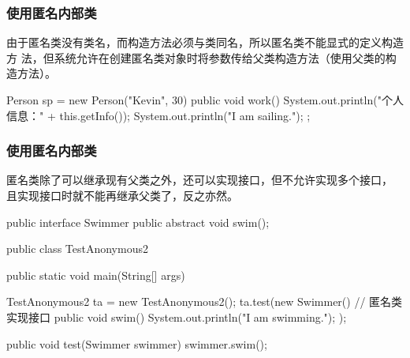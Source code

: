 \begin{frame}[fragile] %
  \frametitle{使用匿名内部类}

  由于匿名类没有类名，而构造方法必须与类同名，所以{\hei 匿名类不能显式的定义构造方
    法}，但系统允许在创建匿名类对象时将参数传给父类构造方法（使用父类的构造方法）。

  \begin{javaCode}
    Person sp = new Person("Kevin", 30) {
      public void work() {
        System.out.println("个人信息：" + this.getInfo());
        System.out.println("I am sailing.");
      }
    };
  \end{javaCode}
\end{frame}

\begin{frame}[fragile] %
  \frametitle{使用匿名内部类}

  匿名类除了可以继承现有父类之外，还可以实现接口，但不允许实现多个接口，
  且实现接口时就不能再继承父类了，反之亦然。


  \begin{javaCode}
    public interface Swimmer {
      public abstract void swim();
    }
  \end{javaCode}

  
  \begin{javaCode}
    public class TestAnonymous2 {
      public static void main(String[] args) {
        TestAnonymous2 ta = new TestAnonymous2();
        ta.test(new Swimmer() { // 匿名类实现接口
          public void swim() {
            System.out.println("I am swimming.");
          }
        });
        
        public void test(Swimmer swimmer) {
          swimmer.swim();
        }
      }
    }
  \end{javaCode}
\end{frame}

